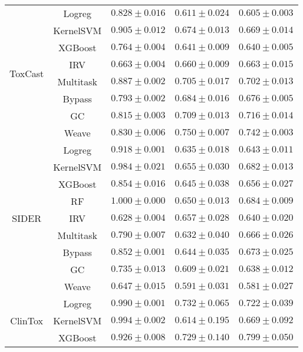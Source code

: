 \begin{table}[H]
\begin{tabular}{ |c|c|c|c|c| }
    \hline
    \hline    
    \multirow{8}{*}{ToxCast}
    & Logreg & $0.828\pm0.016$ & $0.611\pm0.024$ & $0.605\pm0.003$ \\\cline{2-5}
    & KernelSVM & $0.905\pm0.012$ & $0.674\pm0.013$ & $0.669\pm0.014$ \\\cline{2-5}
    & XGBoost & $0.764\pm0.004$ & $0.641\pm0.009$ & $0.640\pm0.005$ \\\cline{2-5}
    & IRV & $0.663\pm0.004$ & $0.660\pm0.009$ & $0.663\pm0.015$ \\\cline{2-5}
    & Multitask & $0.887\pm0.002$ & $0.705\pm0.017$ & $0.702\pm0.013$ \\\cline{2-5}
    & Bypass & $0.793\pm0.002$ & $0.684\pm0.016$ & $0.676\pm0.005$ \\\cline{2-5}
    & GC & $0.815\pm0.003$ & $0.709\pm0.013$ & $0.716\pm0.014$ \\\cline{2-5}
    & Weave & $0.830\pm0.006$ & $\mathbf{0.750\pm0.007}$ & $\mathbf{0.742\pm0.003}$ \\\cline{2-5}
    \hline
    \hline    
    \multirow{9}{*}{SIDER}
    & Logreg & $0.918\pm0.001$ & $0.635\pm0.018$ & $0.643\pm0.011$ \\\cline{2-5}
    & KernelSVM & $0.984\pm0.021$ & $0.655\pm0.030$ & $0.682\pm0.013$ \\\cline{2-5}
    & XGBoost & $0.854\pm0.016$ & $0.645\pm0.038$ & $0.656\pm0.027$ \\\cline{2-5}
    & RF & $1.000\pm0.000$ & $0.650\pm0.013$ & $\mathbf{0.684\pm0.009}$ \\\cline{2-5}
    & IRV & $0.628\pm0.004$ & $\mathbf{0.657\pm0.028}$ & $0.640\pm0.020$ \\\cline{2-5}
    & Multitask & $0.790\pm0.007$ & $0.632\pm0.040$ & $0.666\pm0.026$ \\\cline{2-5}
    & Bypass & $0.852\pm0.001$ & $0.644\pm0.035$ & $0.673\pm0.025$ \\\cline{2-5}
    & GC & $0.735\pm0.013$ & $0.609\pm0.021$ & $0.638\pm0.012$ \\\cline{2-5}
    & Weave & $0.647\pm0.015$ & $0.591\pm0.031$ & $0.581\pm0.027$ \\\cline{2-5}
    \hline
    \hline    
    \multirow{9}{*}{ClinTox}
    & Logreg & $0.990\pm0.001$ & $0.732\pm0.065$ & $0.722\pm0.039$ \\\cline{2-5}
    & KernelSVM & $0.994\pm0.002$ & $0.614\pm0.195$ & $0.669\pm0.092$ \\\cline{2-5}
    & XGBoost & $0.926\pm0.008$ & $0.729\pm0.140$ & $0.799\pm0.050$ \\\cline{2-5}

\end{tabular}
\end{table}
